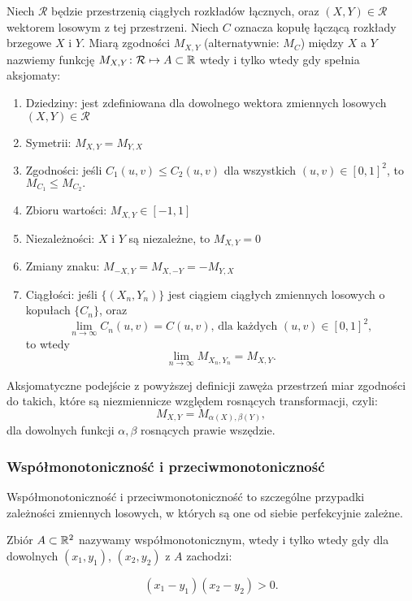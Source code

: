 \begin{df}
	Niech $\mathcal{R}$ będzie przestrzenią ciągłych rozkładów łącznych, oraz $(X, Y) \in \mathcal{R}$ wektorem losowym z tej przestrzeni. Niech $C$ oznacza kopułę łączącą rozkłady brzegowe $X$ i $Y$. Miarą zgodności $M_{X,Y}$ (alternatywnie: $M_C$) między $X$ a $Y$ nazwiemy funkcję $M_{X,Y}\colon \mathcal{R}\mapsto A\subset\mathbb{R}$ wtedy i tylko wtedy gdy spełnia aksjomaty:
	\begin{enumerate}
		\item Dziedziny: jest zdefiniowana dla dowolnego wektora zmiennych losowych $(X, Y) \in \mathcal{R}$
		\item Symetrii: $M_{X,Y}=M_{Y,X}$
		\item Zgodności: jeśli $C_1(u,v) \leqslant C_2(u,v)$ dla wszystkich $(u, v)\in[0,1]^2$, to $M_{C_1} \leqslant M_{C_2}.$
		\item Zbioru wartości: $M_{X,Y}\in[-1,1]$
		\item Niezależności: $X$ i $Y$ są niezależne, to $M_{X,Y}=0$
		\item Zmiany znaku: $M_{-X,Y}=M_{X,-Y}=-M_{Y,X}$
		\item Ciągłości: jeśli $\{(X_n,Y_n)\}$ jest ciągiem ciągłych zmiennych losowych o kopułach $\{C_n\}$, oraz 
		$$ \lim\limits_{n\to\infty} C_n(u, v) =C(u, v)\text{, dla każdych }(u, v)\in[0,1]^2,$$
		to wtedy
		$$ \lim\limits_{n\to\infty}M_{X_n,Y_n}=M_{X,Y}.$$
	\end{enumerate}
	\label{def:miara_zgodnosci}		
\end{df}

Aksjomatyczne podejście z powyższej definicji zawęża przestrzeń miar zgodności do takich, które są niezmiennicze względem rosnących transformacji, czyli:
$$ M_{X,Y} = M_{\alpha(X), \beta(Y)},$$
dla dowolnych funkcji $\alpha,\beta$ rosnących prawie wszędzie.\\

\subsubsection{Współmonotoniczność i przeciwmonotoniczność}
Współmonotoniczność i przeciwmonotoniczność to szczególne przypadki zależności zmiennych losowych, w których są one od siebie perfekcyjnie zależne.

\begin{df}
	Zbiór $A \subset \mathbb{R}^2$ nazywamy współmonotonicznym, wtedy i tylko wtedy gdy dla dowolnych $(x_1, y_1)$, $(x_2, y_2)$ z $A$ zachodzi:
	
	$$ (x_1 - y_1)(x_2 - y_2) >0.$$
\end{df}

